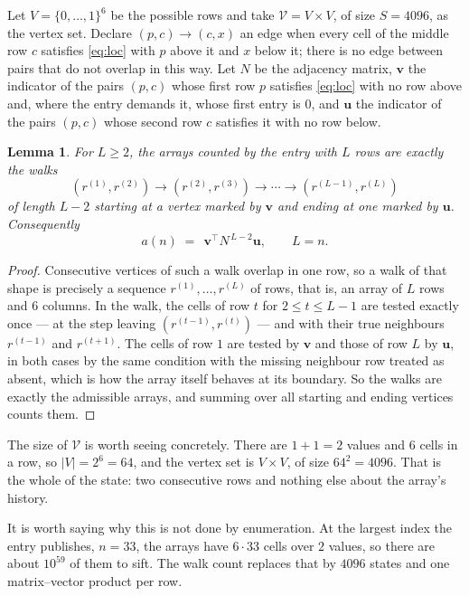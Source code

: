 \documentclass[11pt,a4paper]{article}
\theoremstyle{plain}
\newtheorem{lemma}[theorem]{Lemma}
\theoremstyle{definition}
\begin{document}
Let $V=\{0,\dots,1\}^{6}$ be the possible rows and take
$\mathcal V=V\times V$, of size $S=4096$, as the vertex set. Declare $(p,c)\to(c,x)$ an edge
when every cell of the middle row $c$ satisfies \eqref{eq:loc} with $p$ above it and $x$
below it; there is no edge between pairs that do not overlap in this way. Let $N$ be the
adjacency matrix, $\mathbf{v}$ the indicator of the pairs $(p,c)$ whose first row $p$
satisfies \eqref{eq:loc} with no row above and, where the entry demands it, whose first entry is $0$, and $\mathbf{u}$ the indicator of
the pairs $(p,c)$ whose second row $c$ satisfies it with no row below.

\begin{lemma}\label{lem:walk}
For $L\ge2$, the arrays counted by the entry with $L$ rows are exactly the walks
\[
(r^{(1)},r^{(2)})\to(r^{(2)},r^{(3)})\to\cdots\to(r^{(L-1)},r^{(L)})
\]
of length $L-2$ starting at a vertex marked by $\mathbf{v}$ and ending at one marked by
$\mathbf{u}$. Consequently
\[
a(n)\;=\;\,\mathbf{v}^{\!\top}N^{\,L-2}\mathbf{u},\qquad L=n .
\]
\end{lemma}

\begin{proof}
Consecutive vertices of such a walk overlap in one row, so a walk of that shape is
precisely a sequence $r^{(1)},\dots,r^{(L)}$ of rows, that is, an array of $L$ rows
and $6$ columns. In the walk, the cells of row $t$ for $2\le t\le L-1$ are tested
exactly once --- at the step leaving $(r^{(t-1)},r^{(t)})$ --- and with their true
neighbours $r^{(t-1)}$ and $r^{(t+1)}$. The cells of row $1$ are tested by
$\mathbf{v}$ and those of row $L$ by $\mathbf{u}$, in both cases by the same condition
with the missing neighbour row treated as absent, which is how the array itself behaves at
its boundary. So the walks are exactly the admissible arrays, and summing over all starting
and ending vertices counts them.
\end{proof}


The size of $\mathcal V$ is worth seeing concretely. There are $1+1=2$ values
and $6$ cells in a row, so $|V|=2^{6}=64$, and the vertex set is
$V\times V$, of size $64^2=4096$. That is the whole of the state: two consecutive
rows and nothing else about the array's history.

It is worth saying why this is not done by enumeration. At the largest index the entry
publishes, $n=33$, the arrays have $6\cdot33$ cells over
$2$ values, so there are about $10^{59}$ of them to sift. The
walk count replaces that by $4096$ states and one matrix--vector product per row.
\end{document}
